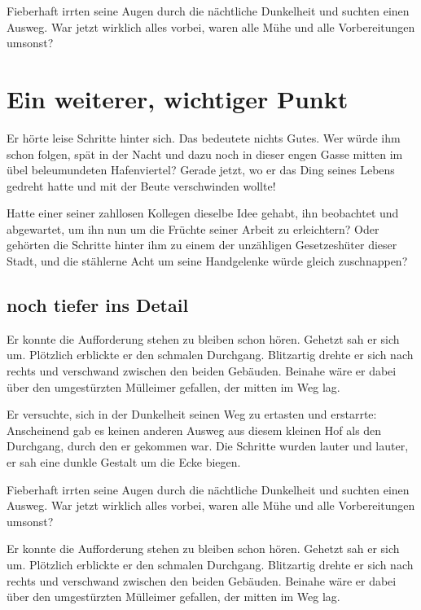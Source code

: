 \documentclass[12pt,ngerman,a4paper,DIV=11]{scrartcl}
\begin{document}
Fieberhaft irrten seine Augen durch die nächtliche Dunkelheit und
suchten einen Ausweg. War jetzt wirklich alles vorbei, waren alle Mühe
und alle Vorbereitungen umsonst?

\section{Ein weiterer, wichtiger
Punkt}\label{ein-weiterer-wichtiger-punkt}

Er hörte leise Schritte hinter sich. Das bedeutete nichts Gutes. Wer
würde ihm schon folgen, spät in der Nacht und dazu noch in dieser engen
Gasse mitten im übel beleumundeten Hafenviertel? Gerade jetzt, wo er das
Ding seines Lebens gedreht hatte und mit der Beute verschwinden wollte!

Hatte einer seiner zahllosen Kollegen dieselbe Idee gehabt, ihn
beobachtet und abgewartet, um ihn nun um die Früchte seiner Arbeit zu
erleichtern? Oder gehörten die Schritte hinter ihm zu einem der
unzähligen Gesetzeshüter dieser Stadt, und die stählerne Acht um seine
Handgelenke würde gleich zuschnappen?

\subsection{noch tiefer ins Detail}\label{noch-tiefer-ins-detail}

Er konnte die Aufforderung stehen zu bleiben schon hören. Gehetzt sah er
sich um. Plötzlich erblickte er den schmalen Durchgang. Blitzartig
drehte er sich nach rechts und verschwand zwischen den beiden Gebäuden.
Beinahe wäre er dabei über den umgestürzten Mülleimer gefallen, der
mitten im Weg lag.

Er versuchte, sich in der Dunkelheit seinen Weg zu ertasten und
erstarrte: Anscheinend gab es keinen anderen Ausweg aus diesem kleinen
Hof als den Durchgang, durch den er gekommen war. Die Schritte wurden
lauter und lauter, er sah eine dunkle Gestalt um die Ecke biegen.

Fieberhaft irrten seine Augen durch die nächtliche Dunkelheit und
suchten einen Ausweg. War jetzt wirklich alles vorbei, waren alle Mühe
und alle Vorbereitungen umsonst?

Er konnte die Aufforderung stehen zu bleiben schon hören. Gehetzt sah er
sich um. Plötzlich erblickte er den schmalen Durchgang. Blitzartig
drehte er sich nach rechts und verschwand zwischen den beiden Gebäuden.
Beinahe wäre er dabei über den umgestürzten Mülleimer gefallen, der
mitten im Weg lag.
\end{document}
